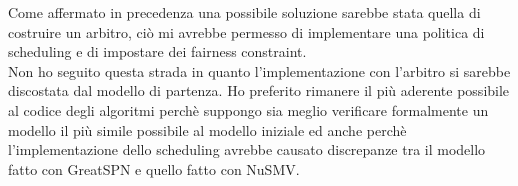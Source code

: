 \documentclass[a4paper]{article}
\begin{document}
Come affermato in precedenza una possibile soluzione sarebbe stata quella di costruire un arbitro, ciò mi avrebbe permesso di implementare una politica di scheduling e di impostare dei fairness constraint.\\
Non ho seguito questa strada in quanto l'implementazione con l'arbitro si sarebbe discostata dal modello di partenza.
Ho preferito rimanere il più aderente possibile al codice degli algoritmi perchè suppongo sia meglio verificare formalmente un modello il più simile possibile al modello iniziale ed anche perchè l'implementazione dello scheduling avrebbe causato discrepanze tra il modello fatto con GreatSPN e quello fatto con NuSMV.
\end{document}

